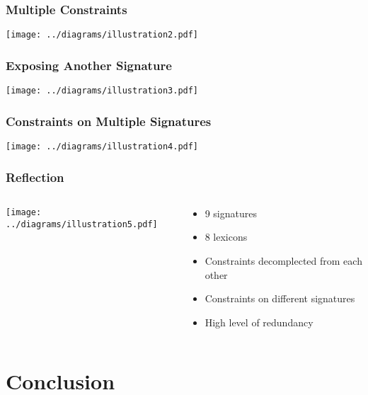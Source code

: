 \documentclass{beamer}
\begin{document}
\begin{frame}
  \frametitle{Multiple Constraints}
  \begin{center}
    \texttt{[image: ../diagrams/illustration2.pdf]}
  \end{center}
\end{frame}

\begin{frame}
  \frametitle{Exposing Another Signature}
  \begin{center}
    \texttt{[image: ../diagrams/illustration3.pdf]}
  \end{center}
\end{frame}

\begin{frame}
  \frametitle{Constraints on Multiple Signatures}
  \begin{center}
    \texttt{[image: ../diagrams/illustration4.pdf]}
  \end{center}
\end{frame}

\begin{frame}
  \frametitle{Reflection}
  \begin{columns}[c]
    \begin{column}{0.5\textwidth}
      \begin{center}
        \texttt{[image: ../diagrams/illustration5.pdf]}
      \end{center}
    \end{column}
    \begin{column}{0.5\textwidth}
      \begin{itemize}
        \item 9 signatures
        \item 8 lexicons
        \item Constraints decomplected from each other
        \item Constraints on different signatures
        \item High level of redundancy
      \end{itemize}
    \end{column}
  \end{columns}
\end{frame}


\section{Conclusion}
\end{document}
